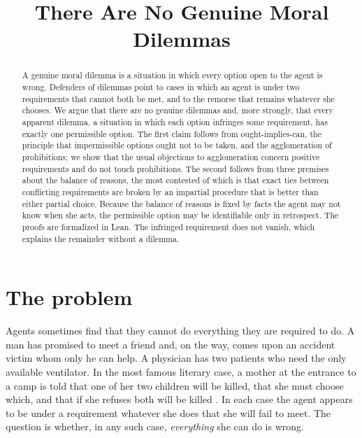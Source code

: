 \documentclass{situationist-preprint}
\title{There Are No Genuine Moral Dilemmas}
\begin{document}
\maketitle

\begin{abstract}
A genuine moral dilemma is a situation in which every option open to the agent is wrong. Defenders of dilemmas point to cases in which an agent is under two requirements that cannot both be met, and to the remorse that remains whatever she chooses. We argue that there are no genuine dilemmas and, more strongly, that every apparent dilemma, a situation in which each option infringes some requirement, has exactly one permissible option. The first claim follows from ought-implies-can, the principle that impermissible options ought not to be taken, and the agglomeration of prohibitions; we show that the usual objections to agglomeration concern positive requirements and do not touch prohibitions. The second follows from three premises about the balance of reasons, the most contested of which is that exact ties between conflicting requirements are broken by an impartial procedure that is better than either partial choice. Because the balance of reasons is fixed by facts the agent may not know when she acts, the permissible option may be identifiable only in retrospect. The proofs are formalized in Lean. The infringed requirement does not vanish, which explains the remainder without a dilemma.
\end{abstract}

\section{The problem}

Agents sometimes find that they cannot do everything they are required to do. A man has promised to meet a friend and, on the way, comes upon an accident victim whom only he can help. A physician has two patients who need the only available ventilator. In the most famous literary case, a mother at the entrance to a camp is told that one of her two children will be killed, that she must choose which, and that if she refuses both will be killed \citep{Styron1979}. In each case the agent appears to be under a requirement whatever she does that she will fail to meet. The question is whether, in any such case, \emph{everything} she can do is wrong.
\end{document}

